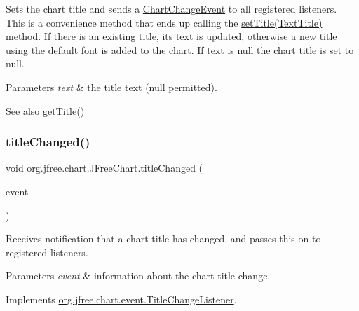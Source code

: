Sets the chart title and sends a \mbox{\hyperlink{}{Chart\+Change\+Event}} to all registered listeners. This is a convenience method that ends up calling the \mbox{\hyperlink{classorg_1_1jfree_1_1chart_1_1_j_free_chart_a45064dfb45c9c2a7e6d2ebb8e71be884}{set\+Title(\+Text\+Title)}} method. If there is an existing title, its text is updated, otherwise a new title using the default font is added to the chart. If {\ttfamily text} is {\ttfamily null} the chart title is set to {\ttfamily null}.


\begin{DoxyParams}{Parameters}
{\em text} & the title text ({\ttfamily null} permitted).\\
\hline
\end{DoxyParams}
\begin{DoxySeeAlso}{See also}
\mbox{\hyperlink{classorg_1_1jfree_1_1chart_1_1_j_free_chart_a4874b3d8f2ebef141b31764ff698fa05}{get\+Title()}} 
\end{DoxySeeAlso}
\mbox{\label{classorg_1_1jfree_1_1chart_1_1_j_free_chart_aff951e786b0f0e11bbe4842f27ddffc9}} 
\subsubsection{\texorpdfstring{title\+Changed()}{titleChanged()}}
{\footnotesize\ttfamily void org.\+jfree.\+chart.\+J\+Free\+Chart.\+title\+Changed (\begin{DoxyParamCaption}\item[{\mbox{\hyperlink{classorg_1_1jfree_1_1chart_1_1event_1_1_title_change_event}{Title\+Change\+Event}}}]{event }\end{DoxyParamCaption})}

Receives notification that a chart title has changed, and passes this on to registered listeners.


\begin{DoxyParams}{Parameters}
{\em event} & information about the chart title change. \\
\hline
\end{DoxyParams}


Implements \mbox{\hyperlink{interfaceorg_1_1jfree_1_1chart_1_1event_1_1_title_change_listener_ad990e311129ba6f5500b44bb0e132cec}{org.\+jfree.\+chart.\+event.\+Title\+Change\+Listener}}.



